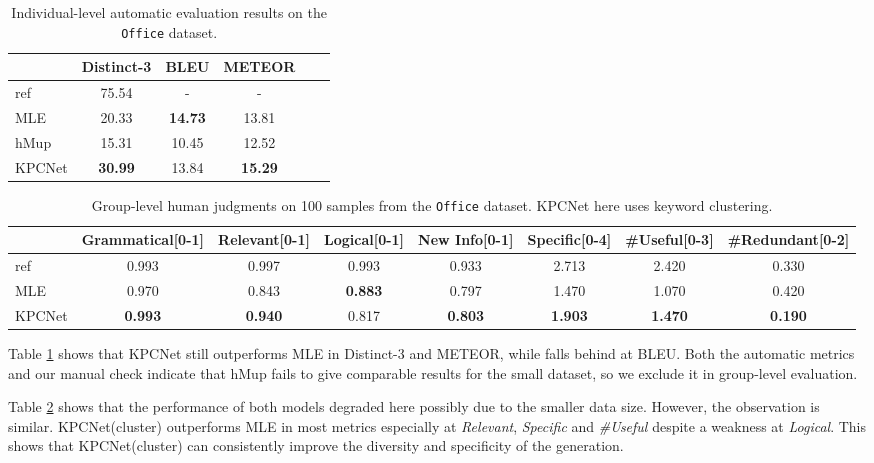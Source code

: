 \begin{table}[htbp]
  \centering
  \small
  \begin{tabular}{l|ccccc}
  \hline
  {} & Distinct-3 & BLEU & METEOR \\
  \hline
  ref  &        75.54 &        - &    - \\
  \hline
  MLE &        20.33 &  \textbf{14.73} & 13.81 \\
  hMup &        15.31 &  10.45 &    12.52  \\
  KPCNet &        \textbf{30.99} &     13.84 &    \textbf{15.29}  \\
  \hline
  \end{tabular}
  \caption{\label{tab:ind-auto-eval-office} Individual-level automatic evaluation results on the \texttt{Office} dataset.}
\end{table}

  
\begin{table}[htbp]
\centering
\small
\begin{tabular}{l|ccccccc}
\hline
{} & Grammatical\tiny{[0-1]} & Relevant\tiny{[0-1]} & Logical\tiny{[0-1]} & New Info\tiny{[0-1]} & Specific\tiny{[0-4]} & \#Useful\tiny{[0-3]} & \#Redundant\tiny{[0-2]} \\
\hline
ref         &       0.993 &    0.997 &   0.993 &    0.933 &    2.713 &   2.420 &      0.330 \\
\hline
MLE         &       0.970 &    0.843 &   \textbf{0.883} &    0.797 &    1.470 &   1.070 &      0.420 \\
KPCNet &       \textbf{0.993} &    \textbf{0.940} &   0.817 &    \textbf{0.803} &    \textbf{1.903} &   \textbf{1.470} &      \textbf{0.190} \\
\hline
\end{tabular}
\caption{\label{tab:group-human-eval-office} Group-level human judgments on 100 samples from the \texttt{Office} dataset. KPCNet here uses keyword clustering.}
\end{table}

Table \ref{tab:ind-auto-eval-office} shows that KPCNet still outperforms MLE in Distinct-3 and METEOR, while falls behind at BLEU. Both the automatic metrics and our manual check indicate that hMup fails to give comparable results for 
the small dataset, so we exclude it in group-level evaluation. 



Table \ref{tab:group-human-eval-office} shows that the performance of both models degraded here possibly due to the smaller data size. However, the observation is similar. KPCNet(cluster) outperforms MLE in most metrics especially at \textit{Relevant}, \textit{Specific} and \textit{\#Useful} despite a weakness at \textit{Logical}. This shows that KPCNet(cluster) can consistently improve the diversity and specificity of the generation.


